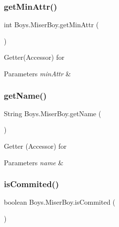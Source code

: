 \subsubsection{\texorpdfstring{get\+Min\+Attr()}{getMinAttr()}}
{\footnotesize\ttfamily int Boys.\+Miser\+Boy.\+get\+Min\+Attr (\begin{DoxyParamCaption}{ }\end{DoxyParamCaption})\hspace{0.3cm}{\ttfamily [inline]}}

Getter(\+Accessor) for 
\begin{DoxyParams}{Parameters}
{\em min\+Attr} & \\
\hline
\end{DoxyParams}
\mbox{\label{class_boys_1_1_miser_boy_a3825c28d25ea937404ab62fd5d23c818}} 
\subsubsection{\texorpdfstring{get\+Name()}{getName()}}
{\footnotesize\ttfamily String Boys.\+Miser\+Boy.\+get\+Name (\begin{DoxyParamCaption}{ }\end{DoxyParamCaption})\hspace{0.3cm}{\ttfamily [inline]}}

Getter (Accessor) for 
\begin{DoxyParams}{Parameters}
{\em name} & \\
\hline
\end{DoxyParams}
\mbox{\label{class_boys_1_1_miser_boy_a52710bdca8ae45b713ed00287201a449}} 
\subsubsection{\texorpdfstring{is\+Commited()}{isCommited()}}
{\footnotesize\ttfamily boolean Boys.\+Miser\+Boy.\+is\+Commited (\begin{DoxyParamCaption}{ }\end{DoxyParamCaption})\hspace{0.3cm}{\ttfamily [inline]}}

